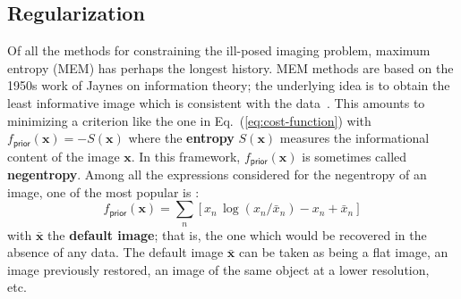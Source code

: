 \documentclass{article}
\newcommand{\vocab}[1]{\textbf{#1}}
\newcommand{\Tag}[1]{\mathsf{#1}}        %
\newcommand{\V}[1]{\boldsymbol{#1}}      %
\newcommand{\M}[1]{\mathbf{#1}}          %
\newcommand{\etc}{etc.\xspace}
\newcommand{\Eq}[1]{Eq.~(\ref{#1})}
\newcommand{\Param}{x}
\newcommand{\VParam}{\V{\Param}}
\newcommand{\PriorTag}{\Tag{prior}}
\newcommand{\Fcost}{f}
\newcommand{\Fprior}{\Fcost_\PriorTag}
\begin{document}

\subsection{Regularization}
\label{sec:regularization}

Of all the methods for constraining the ill-posed imaging problem, maximum
entropy (MEM) has perhaps the longest history. MEM methods are based on the
1950s work of Jaynes on information theory; the underlying idea is to obtain
the least informative image which is consistent with the
data~\citep{Ables-1974-MEM}.  This amounts to minimizing a criterion like the
one in \Eq{eq:cost-function} with $\Fprior(\VParam) = -S(\VParam)$ where the
\vocab{entropy} $S(\VParam)$ measures the informational content of the image
$\VParam$.  In this framework, $\Fprior(\VParam)$ is sometimes called
\vocab{negentropy}.  Among all the expressions considered for the negentropy of
an image, one of the most popular is \citep{Gull_Skilling-1984-MEM}:
\begin{equation}
  \label{eq:mem-prior}
  \Fprior(\VParam) = \sum_n \left[
    \Param_n\,\log( \Param_n/\bar{\Param}_n) - \Param_n + \bar{\Param}_n
  \right]
\end{equation}
with $\bar{\VParam}$ the \vocab{default image}; that is, the one which would
be recovered in the absence of any data.  The default image $\bar{\VParam}$
can be taken as being a flat image, an image previously restored, an image of
the same object at a lower resolution, \etc\
\end{document}
